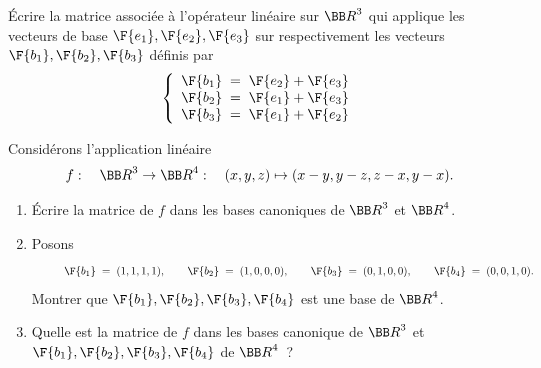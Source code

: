 \documentclass[12pt,french,oneside,a4paper]{memoir} %
\begin{document}
\begin{exo}
Écrire la matrice associée à l'opérateur linéaire sur ${\BB R}^3$ qui applique les vecteurs de base $\F{\mathstrut{e_1}}, \F{\mathstrut{e_2}}, \F{\mathstrut{e_3}}$ sur
respectivement les vecteurs $\F{\mathstrut{b_1}}, \F{\mathstrut{b_2}}, \F{\mathstrut{b_3}}$ définis par 
\begin{equation*}
\left\{ \begin{array}{l}
\F{\mathstrut{b_1}} \;=\; \F{\mathstrut{e_2}}+ \F{\mathstrut{e_3}} \\
\F{\mathstrut{b_2}} \;=\; \F{\mathstrut{e_1}}+ \F{\mathstrut{e_3}} \\
\F{\mathstrut{b_3}} \;=\; \F{\mathstrut{e_1}}+ \F{\mathstrut{e_2}} 
\end{array} \right.
\end{equation*}
\end{exo}

\begin{exo}
Considérons l'application linéaire
\begin{equation*}
f :\quad {\BB R}^3 \rightarrow {\BB R}^4 :\quad (x,y,z) \mapsto 
(x-y, y-z, z-x, y-x).
\end{equation*}
\begin{enumerate}
\item Écrire la matrice de $f$ dans les bases canoniques de ${\BB R}^3$ et 
${\BB R}^4$. 
\item Posons
\begin{equation*}
\hspace*{10mm}
\F{b_1} \;=\; (1,1,1,1), \qquad
\F{b_2} \;=\; (1,0,0,0), \qquad
\F{b_3} \;=\; (0,1,0,0), \qquad
\F{b_4} \;=\; (0,0,1,0).
\end{equation*}
Montrer que $\F{b_1}, \F{b_2}, \F{b_3}, \F{b_4}$ est une base de ${\BB R}^4$. 
\item Quelle est la matrice de $f$ dans les bases canonique de ${\BB R}^3$ et $\F{b_1}, \F{b_2}, \F{b_3}, \F{b_4}$ de ${\BB R}^4$~?
\end{enumerate}
\end{exo}
\end{document}

